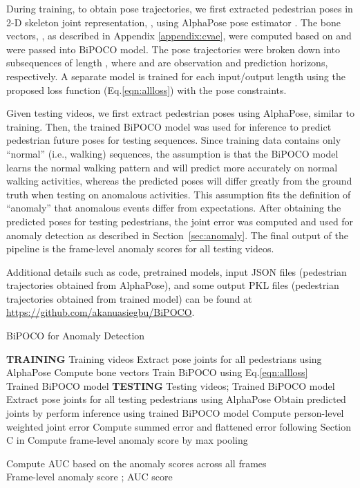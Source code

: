 \documentclass[nohyperref]{article}
\theoremstyle{plain}
\theoremstyle{definition}
\theoremstyle{remark}
\begin{document}
During training, to obtain pose trajectories, we first extracted pedestrian poses in 2-D skeleton joint representation, , using AlphaPose pose estimator \cite{fang2017rmpe,xiu2018poseflow}. The bone vectors, , as described in Appendix \ref{appendix:cvae}, were computed based on  and were passed into BiPOCO model. The pose trajectories were broken down into subsequences of length , where  and  are observation and prediction horizons, respectively. A separate model is trained for each input/output length  using the proposed loss function (Eq.\eqref{eqn:allloss}) with the pose constraints. 

Given testing videos, we first extract pedestrian poses using AlphaPose, similar to training. Then, the trained BiPOCO model was used for inference to predict pedestrian future poses for testing sequences. Since training data contains only ``normal'' (i.e., walking) sequences, the assumption is that the BiPOCO model learns the normal walking pattern and will predict more accurately on normal walking activities, whereas the predicted poses will differ greatly from the ground truth when testing on anomalous activities. This assumption fits the definition of ``anomaly'' that anomalous events differ from expectations. After obtaining the predicted poses for testing pedestrians, the joint error was computed and used for anomaly detection as described in Section~\ref{sec:anomaly}. The final output of the pipeline is the frame-level anomaly scores for all testing videos.

Additional details such as code, pretrained models, input JSON files (pedestrian trajectories obtained from AlphaPose), and some output PKL files (pedestrian trajectories obtained from trained model) can be found at  \url{https://github.com/akanuasiegbu/BiPOCO}.


\begin{algorithm}[t]
\caption{BiPOCO for Anomaly Detection} 
\label{alg:1}
\begin{algorithmic} 
\State  \textbf{TRAINING} 
\Require Training videos 
\State Extract pose joints  for all pedestrians using AlphaPose
\State Compute bone vectors   
\State Train BiPOCO using  Eq.\eqref{eqn:allloss}\\
\Return Trained BiPOCO model
\Statex 
\Statex  \textbf{TESTING}
\Require Testing videos; Trained BiPOCO model
\State Extract pose joints  for all testing pedestrians using AlphaPose
\State Obtain predicted joints  by perform inference using trained BiPOCO model
\State Compute person-level weighted joint error  
\State Compute summed error and flattened error following Section C in \cite{kanu2021leveraging}
\State Compute frame-level anomaly score by max pooling

\State Compute AUC based on the anomaly scores across all frames\\
\Return Frame-level anomaly score ; AUC score
\end{algorithmic}
\end{algorithm}
\end{document}
